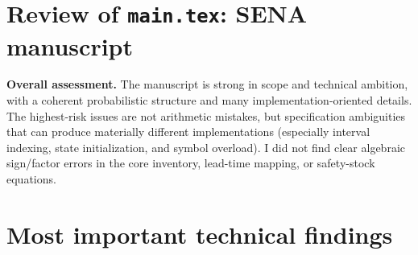 \documentclass[11pt]{article}
\begin{document}
\section*{Review of \texttt{main.tex}: SENA manuscript}

\textbf{Overall assessment.}
The manuscript is strong in scope and technical ambition, with a coherent probabilistic structure and many implementation-oriented details.
The highest-risk issues are not arithmetic mistakes, but specification ambiguities that can produce materially different implementations (especially interval indexing, state initialization, and symbol overload).
I did not find clear algebraic sign/factor errors in the core inventory, lead-time mapping, or safety-stock equations.

\section*{Most important technical findings}
\end{document}
